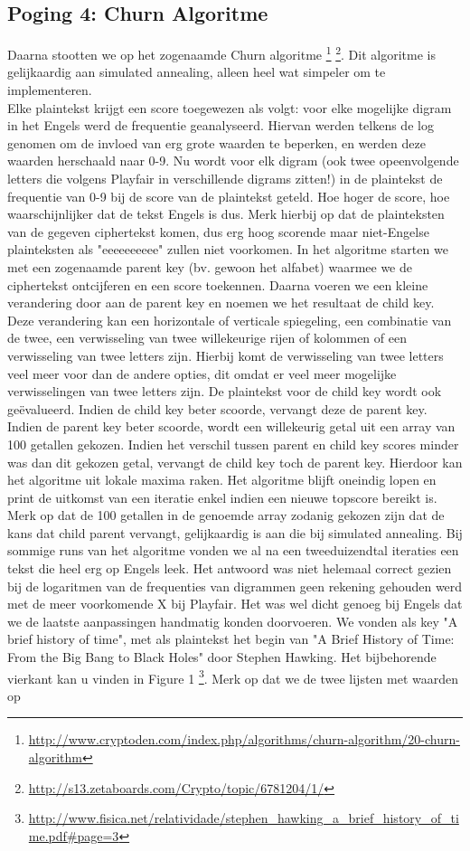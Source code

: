 \subsection{Poging 4: Churn Algoritme}
Daarna stootten we op het zogenaamde Churn algoritme \footnote{\url{http://www.cryptoden.com/index.php/algorithms/churn-algorithm/20-churn-algorithm}} \footnote{\url{http://s13.zetaboards.com/Crypto/topic/6781204/1/}}. Dit algoritme is gelijkaardig aan simulated annealing, alleen heel wat simpeler om te implementeren. \\ 
Elke plaintekst krijgt een score toegewezen als volgt: voor elke mogelijke digram in het Engels werd de frequentie geanalyseerd. Hiervan werden telkens de log genomen om de invloed van erg grote waarden te beperken, en werden deze waarden herschaald naar 0-9. Nu wordt voor elk digram (ook twee opeenvolgende letters die volgens Playfair in verschillende digrams zitten!) in de plaintekst de frequentie van 0-9 bij de score van de plaintekst geteld. Hoe hoger de score, hoe waarschijnlijker dat de tekst Engels is dus. Merk hierbij op dat de plainteksten van de gegeven ciphertekst komen, dus erg hoog scorende maar niet-Engelse plainteksten als "eeeeeeeeee" zullen niet voorkomen. In het algoritme starten we met een zogenaamde parent key (bv. gewoon het alfabet) waarmee we de ciphertekst ontcijferen en een score toekennen. Daarna voeren we een kleine verandering door aan de parent key en noemen we het resultaat de child key. Deze verandering kan een horizontale of verticale spiegeling, een combinatie van de twee, een verwisseling van twee willekeurige rijen of kolommen of een verwisseling van twee letters zijn. Hierbij komt de verwisseling van twee letters veel meer voor dan de andere opties, dit omdat er veel meer mogelijke verwisselingen van twee letters zijn. De plaintekst voor de child key wordt ook ge\"evalueerd. Indien de child key beter scoorde, vervangt deze de parent key. Indien de parent key beter scoorde, wordt een willekeurig getal uit een array van 100 getallen gekozen. Indien het verschil tussen parent en child key scores minder was dan dit gekozen getal, vervangt de child key toch de parent key. Hierdoor kan het algoritme uit lokale maxima raken. Het algoritme blijft oneindig lopen en print de uitkomst van een iteratie enkel indien een nieuwe topscore bereikt is. Merk op dat de 100 getallen in de genoemde array zodanig gekozen zijn dat de kans dat child parent vervangt, gelijkaardig is aan die bij simulated annealing. Bij sommige runs van het algoritme vonden we al na een tweeduizendtal iteraties een tekst die heel erg op Engels leek. Het antwoord was niet helemaal correct gezien bij de logaritmen van de frequenties van digrammen geen rekening gehouden werd met de meer voorkomende X bij Playfair. Het was wel dicht genoeg bij Engels dat we de laatste aanpassingen handmatig konden doorvoeren. We vonden als key "A brief history of time", met als plaintekst het begin van "A Brief History of Time: From the Big Bang to Black Holes" door Stephen Hawking. Het bijbehorende vierkant kan u vinden in Figure 1 \footnote{\url{http://www.fisica.net/relatividade/stephen_hawking_a_brief_history_of_time.pdf\#page=3}}. Merk op dat we de twee lijsten met waarden op 